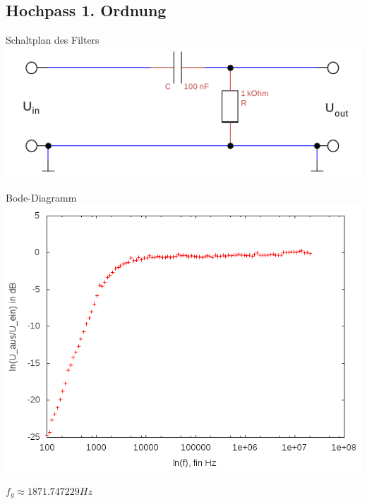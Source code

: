 \documentclass[compress,11pt]{beamer}
\begin{document}
\subsection{Hochpass 1. Ordnung}

\begin{frame}\begin{block}{Schaltplan des Filters}
\includegraphics[width=\textwidth]{../daten/Messdaten/plots/schalt_hoch}
\end{block}\end{frame}
\begin{frame}\begin{block}{Bode-Diagramm}
\centering
\includegraphics[width=.7\textwidth]{../daten/Messdaten/plots/Aufgabe2Bodediagramm_hochpass_gain}
\end{block}

$f_g \approx  1871.747229 Hz$
\end{frame}
\end{document}
